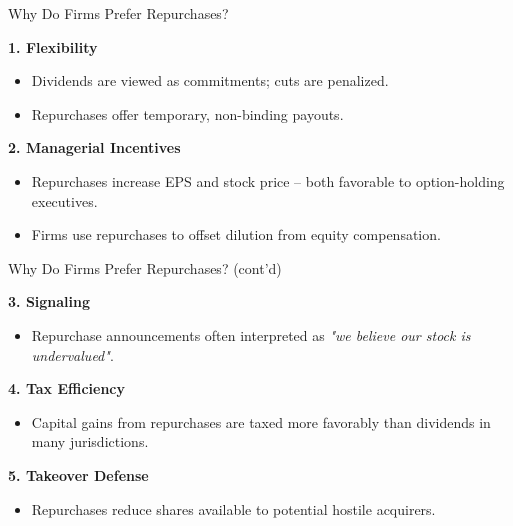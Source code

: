 \begin{frame}{Why Do Firms Prefer Repurchases?}

\textbf{1. Flexibility}
\begin{itemize}
    \item Dividends are viewed as commitments; cuts are penalized.
    \item Repurchases offer temporary, non-binding payouts.
\end{itemize}

\vspace{2mm}
\textbf{2. Managerial Incentives}
\begin{itemize}
    \item Repurchases increase EPS and stock price -- both favorable to option-holding executives.
    \item Firms use repurchases to offset dilution from equity compensation.
\end{itemize}

\end{frame}

\begin{frame}{Why Do Firms Prefer Repurchases? (cont'd)}

\textbf{3. Signaling}
\begin{itemize}
    \item Repurchase announcements often interpreted as \textit{"we believe our stock is undervalued"}.
\end{itemize}

\vspace{2mm}
\textbf{4. Tax Efficiency}
\begin{itemize}
    \item Capital gains from repurchases are taxed more favorably than dividends in many jurisdictions.
\end{itemize}

\vspace{2mm}
\textbf{5. Takeover Defense}
\begin{itemize}
    \item Repurchases reduce shares available to potential hostile acquirers.
\end{itemize}

\end{frame}

